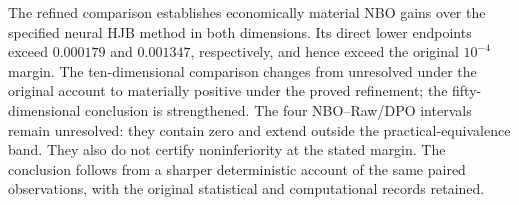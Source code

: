 The refined comparison establishes economically material NBO gains over
the specified neural HJB method in both dimensions. Its direct lower
endpoints exceed $0.000179$ and $0.001347$, respectively, and hence exceed
the original $10^{-4}$ margin. The ten-dimensional comparison changes from
unresolved under the original account to materially positive under the
proved refinement; the fifty-dimensional conclusion is strengthened.
The four NBO--Raw/DPO intervals remain unresolved: they contain zero and
extend outside the practical-equivalence band. They also do not certify
noninferiority at the stated margin. The conclusion follows from a
sharper deterministic account of the same paired observations, with the
original statistical and computational records retained.

